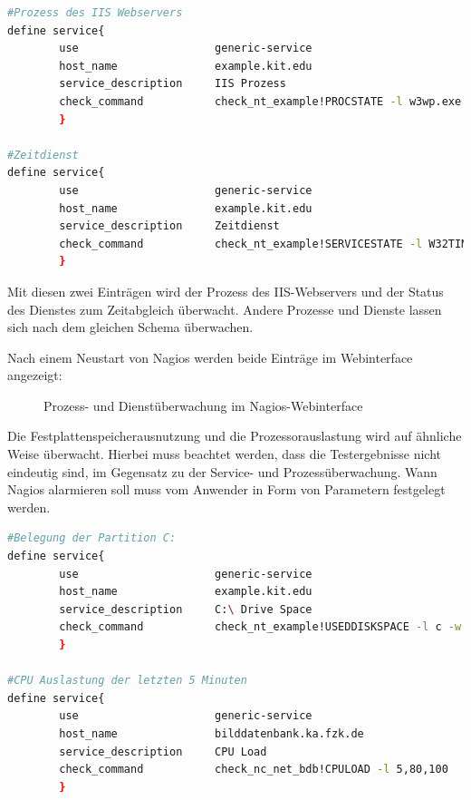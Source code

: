 \begin{lstlisting}[captionpos=b, caption=Prozess- und Service-Check Servicedefintionen, label=procservdef, breaklines = true, language=sh]
#Prozess des IIS Webservers
define service{
        use                     generic-service
        host_name               example.kit.edu
        service_description     IIS Prozess
        check_command           check_nt_example!PROCSTATE -l w3wp.exe
        }

#Zeitdienst
define service{
        use                     generic-service
        host_name               example.kit.edu
        service_description     Zeitdienst
        check_command           check_nt_example!SERVICESTATE -l W32TIME
        }
\end{lstlisting}

Mit diesen zwei Einträgen wird der Prozess des \gls{IIS}-Webservers und der Status des Dienstes zum Zeitabgleich überwacht.
Andere Prozesse und Dienste lassen sich nach dem gleichen Schema überwachen.

Nach einem Neustart von Nagios werden beide Einträge im Webinterface angezeigt:

\begin{figure}[ht]
	\centering
		\caption{Prozess- und Dienstüberwachung im Nagios-Webinterface}
		\label{servprocgui}
\end{figure}

Die Festplattenspeicherausnutzung und die Prozessorauslastung wird auf ähnliche Weise überwacht.
Hierbei muss beachtet werden, dass die Testergebnisse nicht eindeutig sind, im Gegensatz zu der Service- und Prozessüberwachung.
Wann Nagios alarmieren soll muss vom Anwender in Form von Parametern festgelegt werden.

\begin{lstlisting}[captionpos=b, caption=Überwachung der Festplatten- und Prozessorauslastung, label=cpuhdddef, breaklines = true, language=sh]
#Belegung der Partition C:
define service{
        use                     generic-service
        host_name               example.kit.edu
        service_description     C:\ Drive Space
        check_command           check_nt_example!USEDDISKSPACE -l c -w 85 -c 100
        }
        
#CPU Auslastung der letzten 5 Minuten
define service{
        use                     generic-service
        host_name               bilddatenbank.ka.fzk.de
        service_description     CPU Load
        check_command           check_nc_net_bdb!CPULOAD -l 5,80,100
        }
\end{lstlisting}

